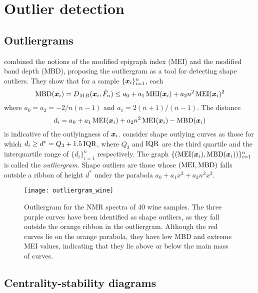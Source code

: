 \section{Outlier detection}


\subsection{Outliergrams}

\textcite{gil-romo-2014} combined the notions of the modified epigraph index
(MEI) and the modified band depth (MBD), proposing the outliergram as a tool
for detecting shape outliers.
They show that for a sample $\{\bm{x}_i\}_{i = 1}^n$, each
\begin{equation}
    \operatorname{MBD}(\bm{x}_i) = D_{MB}(\bm{x}_i, \hat{F}_n) \leq a_0 + a_1 \operatorname{MEI}(\bm{x}_i) + a_2 n^2 \operatorname{MEI}(\bm{x}_i)^2
\end{equation}
where $a_0 = a_2 = -2/n(n - 1)$ and $a_1 = 2(n + 1)/(n - 1)$.
The distance
\begin{equation}
    d_i = a_0 + a_1 \operatorname{MEI}(\bm{x}_i) + a_2 n^2 \operatorname{MEI}(\bm{x}_i) - \operatorname{MBD}(\bm{x}_i)
\end{equation}
is indicative of the outlyingness of $\bm{x}_i$.
\textcite{gil-romo-2014} consider shape outlying curves as those for which
$d_i \geq d^* = Q_3 + 1.5\operatorname{IQR}$, where $Q_3$ and $\operatorname{IQR}$ are the third quartile
and the interquartile range of $\{d_i\}_{i = 1}^n$ respectively.
The graph $\{(\operatorname{MEI}(\bm{x}_i), \operatorname{MBD}(\bm{x}_i))\}_{i = 1}^n$ is called the
\emph{outliergram}.
Shape outliers are those whose $(\operatorname{MEI}, \operatorname{MBD})$ falls outside a ribbon of height
$d^*$ under the parabola $a_0 + a_1 x^2 + a_2n^2x^2$.

\begin{figure}
    \centering
    \texttt{[image: outliergram\_wine]}
    \caption{
        Outliergram for the NMR spectra of 40 wine samples.
        The three purple curves have been identified as shape outliers, as
        they fall outside the orange ribbon in the outliergram.
        Although the red curves lie on the orange parabola, they have low MBD
        and extreme MEI values, indicating that they lie above or below the
        main mass of curves.
    }
    \label{fig:outliergram_wine}
\end{figure}



\subsection{Centrality-stability diagrams}

